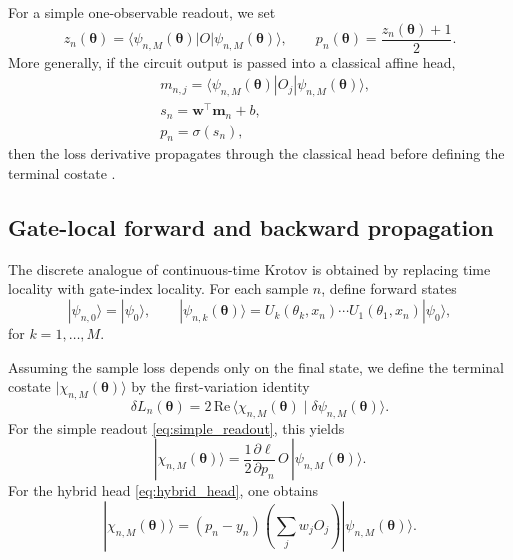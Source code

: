 \documentclass[aps,prb,10pt,twocolumn,superscriptaddress]{revtex4-2}
\begin{document}
For a simple one-observable readout, we set
\begin{equation}
z_n(\bm{\theta})
=
\langle \psi_{n,M}(\bm{\theta})|O|\psi_{n,M}(\bm{\theta})\rangle,
\qquad
p_n(\bm{\theta})=\frac{z_n(\bm{\theta})+1}{2}.
\label{eq:simple_readout}
\end{equation}
More generally, if the circuit output is passed into a classical affine head,
\begin{align}
&m_{n,j}
=
\langle \psi_{n,M}(\bm{\theta})|O_j|\psi_{n,M}(\bm{\theta})\rangle,\\
&s_n=\bm{w}^{\top}\bm{m}_n+b, \\
&p_n=\sigma(s_n),
\label{eq:hybrid_head}
\end{align}
then the loss derivative propagates through the classical head before defining the terminal costate \cite{SchuldEtAl2019Gradients,BanchiCrooks2021SPSR,WierichsEtAl2022ShiftRules}.

\subsection{Gate-local forward and backward propagation}

The discrete analogue of continuous-time Krotov is obtained by replacing time locality with gate-index locality. For each sample \(n\), define forward states
\begin{equation}
|\psi_{n,0}\rangle=|\psi_0\rangle,
\qquad
|\psi_{n,k}(\bm{\theta})\rangle
=
U_k(\theta_k,x_n)\cdots U_1(\theta_1,x_n)|\psi_0\rangle,
\label{eq:forward_states}
\end{equation}
for \(k=1,\dots,M\).

Assuming the sample loss depends only on the final state, we define the terminal costate \(|\chi_{n,M}(\bm{\theta})\rangle\) by the first-variation identity
\begin{equation}
\delta L_n(\bm{\theta})
=
2\,\mathrm{Re}\,
\langle \chi_{n,M}(\bm{\theta}) \mid \delta \psi_{n,M}(\bm{\theta}) \rangle.
\label{eq:first_variation}
\end{equation}
For the simple readout \eqref{eq:simple_readout}, this yields
\begin{equation}
|\chi_{n,M}(\bm{\theta})\rangle
=
\frac{1}{2}\frac{\partial \ell}{\partial p_n}
\,O\,|\psi_{n,M}(\bm{\theta})\rangle.
\label{eq:terminal_costate_simple}
\end{equation}
For the hybrid head \eqref{eq:hybrid_head}, one obtains
\begin{equation}
|\chi_{n,M}(\bm{\theta})\rangle
=
(p_n-y_n)
\left(\sum_j w_j O_j\right)
|\psi_{n,M}(\bm{\theta})\rangle.
\label{eq:terminal_costate_hybrid}
\end{equation}
\end{document}
